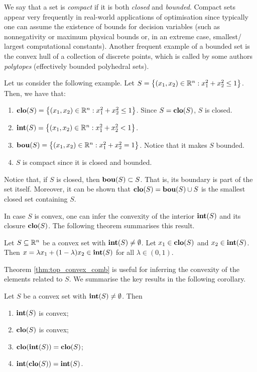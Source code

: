 We say that a set is \emph{compact} if it is both \emph{closed} and \emph{bounded}. Compact sets appear very frequently in real-world applications of optimisation since typically one can assume the existence of bounds for decision variables (such as nonnegativity or maximum physical bounds or, in an extreme case, smallest/ largest computational constants). Another frequent example of a bounded set is the convex hull of a collection of discrete points, which is called by some authors \emph{polytopes} (effectively bounded polyhedral sets).  

Let us consider the following example. Let $S = \left\{ (x_1,x_2) \in \mathbb{R}^n : x_1^2 + x_2^2 \leq 1 \right \}$. Then, we have that:
\begin{enumerate}
	\item $\mathop{\bf clo}(S) = \left\{ (x_1,x_2) \in \mathbb{R}^n : x_1^2 + x_2^2 \leq 1 \right \}$. Since $S = \mathop{\bf clo}(S)$, $S$ is closed.
	\item $\mathop{\bf int}(S) = \left\{ (x_1,x_2) \in \mathbb{R}^n : x_1^2 + x_2^2 < 1 \right \}$. 
	\item $\mathop{\bf bou}(S) = \left\{ (x_1,x_2) \in \mathbb{R}^n : x_1^2 + x_2^2 = 1 \right \}$. Notice that it makes $S$ bounded.
	\item $S$ is compact since it is closed and bounded. 
\end{enumerate}

Notice that, if $S$ is closed, then $\mathop{\bf bou}(S) \subset S$. That is, its boundary is part of the set itself. Moreover, it can be shown that $\mathop{\bf clo}(S) = \mathop{\bf bou}(S) \cup S$ is the smallest closed set containing $S$. 

In case $S$ is convex, one can infer the convexity of the interior $\mathop{\bf int}(S)$ and its closure $\mathop{\bf clo}(S)$. The following theorem summarises this result.
%
\begin{theorem}\label{thm:top_convex_comb}
Let $S \subseteq \mathbb{R}^n$ be a convex set with $\mathop{\bf int}(S) \neq \emptyset$. Let $x_1 \in \mathop{\bf clo}(S)$ and $x_2 \in \mathop{\bf int}(S)$. Then $x = \lambda x_1 + (1 - \lambda) x_2 \in \mathop{\bf int}(S)$ for all $\lambda \in (0,1)$.
\end{theorem}
%


Theorem \ref{thm:top_convex_comb} is useful for inferring the convexity of the elements related to $S$. We summarise the key results in the following corollary.
%
\begin{corollary} Let $S$ be a convex set with $\mathop{\bf int}(S) \neq \emptyset$. Then
	\begin{enumerate}
		\item $\mathop{\bf int}(S)$ is convex;
		\item $\mathop{\bf clo}(S)$ is convex;
		\item $\mathop{\bf clo}(\mathop{\bf int}(S)) = \mathop{\bf clo}(S)$;
		\item $\mathop{\bf int}(\mathop{\bf clo}(S)) = \mathop{\bf int}(S)$.
	\end{enumerate}
\end{corollary}
%

